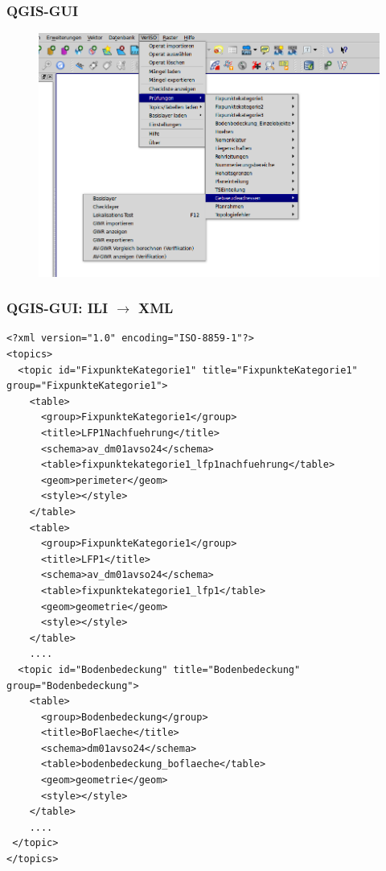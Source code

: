 \documentclass{beamer}
\begin{document}
\begin{frame}
  \frametitle{QGIS-GUI}
  \begin{figure}
    \includegraphics[scale=0.35]{bilder/veriso_checks_3.png}
  \end{figure}
\end{frame}

\begin{frame}[fragile]
  \frametitle{QGIS-GUI: ILI $\rightarrow$ XML}
  \begin{tiny}
  \begin{verbatim}
<?xml version="1.0" encoding="ISO-8859-1"?>
<topics>
  <topic id="FixpunkteKategorie1" title="FixpunkteKategorie1" group="FixpunkteKategorie1">
    <table>
      <group>FixpunkteKategorie1</group>
      <title>LFP1Nachfuehrung</title>
      <schema>av_dm01avso24</schema>
      <table>fixpunktekategorie1_lfp1nachfuehrung</table>
      <geom>perimeter</geom>
      <style></style>
    </table>
    <table>
      <group>FixpunkteKategorie1</group>
      <title>LFP1</title>
      <schema>av_dm01avso24</schema>
      <table>fixpunktekategorie1_lfp1</table>
      <geom>geometrie</geom>
      <style></style>
    </table>
    ....
  <topic id="Bodenbedeckung" title="Bodenbedeckung" group="Bodenbedeckung">   
    <table>
      <group>Bodenbedeckung</group>
      <title>BoFlaeche</title>
      <schema>dm01avso24</schema>
      <table>bodenbedeckung_boflaeche</table>
      <geom>geometrie</geom>
      <style></style>
    </table>
    ....
 </topic>
</topics>    
  \end{verbatim}
  \end{tiny}
\end{frame}
\end{document}
